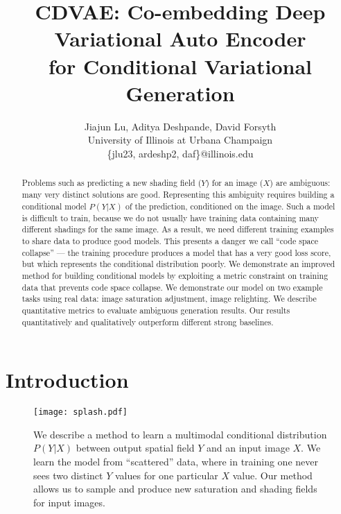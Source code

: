 \documentclass[10pt,twocolumn,letterpaper]{article}
\begin{document}
\title{CDVAE: Co-embedding Deep Variational Auto Encoder \\
for Conditional Variational Generation}

\author{Jiajun Lu, Aditya Deshpande, David Forsyth\\
University of Illinois at Urbana Champaign\\
\{jlu23, ardeshp2, daf\}@illinois.edu
}

\maketitle


\begin{abstract}
Problems such as predicting a new shading field ($Y$) for an image ($X$) are ambiguous: many very distinct solutions are good. 
Representing this ambiguity requires building a conditional model
$P(Y|X)$ of the prediction, conditioned on the image.  Such a model is difficult to train, because we do not usually have
training  data containing many different shadings for the same image. As a result, we need different training examples
to share data to produce good models.  This presents a danger we call ``code space collapse'' --- the training procedure
produces a model that has a very good loss score, but which represents the conditional distribution poorly.  
We demonstrate an improved method for building conditional models by exploiting a metric constraint on training data
that prevents code space collapse.  We demonstrate our model on two example tasks using real data: image saturation
adjustment,  image relighting. We describe quantitative metrics to evaluate ambiguous generation results.  
Our results quantitatively and qualitatively outperform different strong baselines.
\end{abstract}

\section{Introduction}
\label{sec:intro}

\begin{figure}[ht]
\centerline{  \texttt{[image: splash.pdf]}}
  \caption{We describe a method to learn a multimodal conditional distribution $P(Y|X)$ between output spatial field $Y$
    and an input image $X$. We learn the model from ``scattered'' data, where in training one never sees two distinct $Y$ values 
    for one particular $X$ value.  Our method allows us to sample and produce new saturation and shading fields for input images.}
  \label{fig:teaser}
\end{figure}
\end{document}
